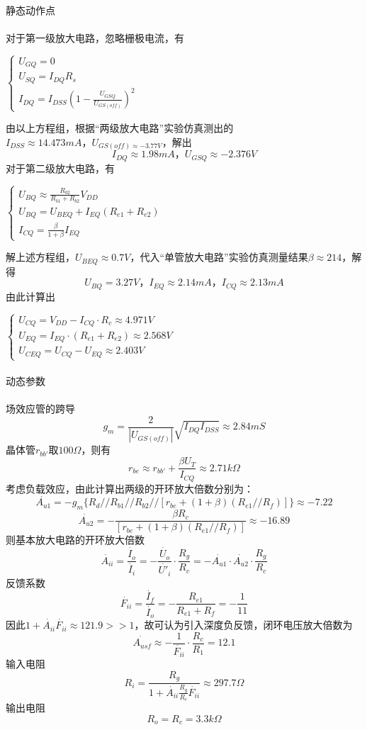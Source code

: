 \documentclass[12pt,a4paper]{article}
\begin{document}
\begin{spacing}{1.3}
\paragraph{}静态动作点\\\\
对于第一级放大电路，忽略栅极电流，有
\begin{center}
$\begin{cases}
U_{GQ} = 0\\
U_{SQ} = I_{DQ}R_s\\
I_{DQ} = I_{DSS}(1-\frac{U_{GSQ}}{U_{GS(off)}})^2
\end{cases}$
\end{center}
由以上方程组，根据“两级放大电路”实验仿真测出的$I_{DSS} \approx 14.473mA，U_{GS(off) \approx -3.77V}$，解出
\[
I_{DQ} \approx 1.98mA，U_{GSQ} \approx -2.376V
\]
对于第二级放大电路，有
\begin{center}
$\begin{cases}
U_{BQ} \approx \frac{R_{b2}}{R_{b1}+R_{b2}} V_{DD}\\
U_{BQ} = U_{BEQ} + I_{EQ}(R_{e1}+R_{e2})\\
I_{CQ} = \frac{\beta}{1+\beta} I_{EQ}
\end{cases}$
\end{center}
解上述方程组，$U_{BEQ}\approx 0.7V$，代入“单管放大电路”实验仿真测量结果$\beta \approx 214$，解得
\[
U_{BQ} = 3.27V，I_{EQ}\approx 2.14mA，I_{CQ}\approx 2.13mA
\]
由此计算出
\begin{center}
$\begin{cases}
U_{CQ} = V_{DD}-I_{CQ}\cdot R_c \approx 4.971V\\
U_{EQ} = I_{EQ}\cdot (R_{e1}+R_{e2}) \approx 2.568V\\
U_{CEQ} = U_{CQ} - U_{EQ} \approx 2.403V
\end{cases}$
\end{center}
\paragraph{}动态参数\\\\
场效应管的跨导
\[
g_m = \frac{2}{|U_{GS(off)}|}\sqrt{I_{DQ}I_{DSS}} \approx 2.84mS
\]
晶体管$r_{bb'}取100\Omega$，则有
\[
r_{be} \approx r_{bb'} + \frac{\beta U_T}{I_{CQ}} \approx  2.71k\Omega
\]
考虑负载效应，由此计算出两级的开环放大倍数分别为：
\[
\dot{A_{u1}} = -g_m\{R_d//R_{b1}//R_{b2}//[r_{be}+(1+\beta)(R_{e1}//R_f)]\} \approx -7.22
\]
\[
\dot{A_{u2}} = -\frac{\beta R_c}{[r_{be}+(1+\beta)(R_{e1}//R_f)]} \approx -16.89
\]
则基本放大电路的开环放大倍数
\[
\dot{A_{ii}} = \frac{\dot{I_o}}{\dot{I_i}} = -\frac{\dot{U_o}}{\dot{U'_i}} \cdot \frac{R_g}{R_c} = -\dot{A_{u1}} \cdot \dot{A_{u2}} \cdot \frac{R_g}{R_c}
\]
反馈系数
\[
\dot{F_{ii}} = \frac{\dot{I_f}}{\dot{I_o}} = -\frac{R_{e1}}{R_{e1}+R_f} = -\frac{1}{11}
\]
因此$1 + \dot{A_{ii}}\dot{F_{ii}}\approx 121.9 >> 1$，故可认为引入深度负反馈，闭环电压放大倍数为
\[
\dot{A_{usf}} \approx -\frac{1}{\dot{F_{ii}}}\cdot \frac{R_c}{R_1} = 12.1
\]
输入电阻
\[
R_i = \frac{R_g}{1 + \dot{A_{ii}} \frac{R_g}{R_c} \dot{F_{ii}}} \approx 297.7\Omega
\]
输出电阻
\[
R_o = R_c = 3.3k\Omega
\]

\end{spacing}
\end{document}
